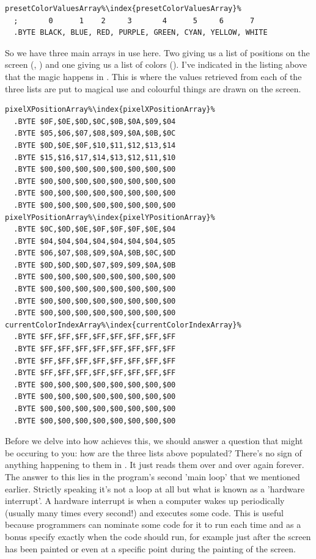 \begin{lstlisting}[escapechar=\%]
presetColorValuesArray%\index{presetColorValuesArray}%
  ;       0      1    2     3       4      5     6      7
  .BYTE BLACK, BLUE, RED, PURPLE, GREEN, CYAN, YELLOW, WHITE
\end{lstlisting}

So we have three main arrays in use here. Two giving us a list of positions on the screen (, )
and one giving us a list of colors (). I've indicated in the listing above that the magic happens in 
. This is where the values retrieved from each of the three lists are put to magical use and colourful things
are drawn on the screen.

\begin{lstlisting}[caption=The arrays have a larger capacity than is actually used\, each one above is 64 bytes long.,escapechar=\%]
pixelXPositionArray%\index{pixelXPositionArray}%   
  .BYTE $0F,$0E,$0D,$0C,$0B,$0A,$09,$04
  .BYTE $05,$06,$07,$08,$09,$0A,$0B,$0C
  .BYTE $0D,$0E,$0F,$10,$11,$12,$13,$14
  .BYTE $15,$16,$17,$14,$13,$12,$11,$10
  .BYTE $00,$00,$00,$00,$00,$00,$00,$00
  .BYTE $00,$00,$00,$00,$00,$00,$00,$00
  .BYTE $00,$00,$00,$00,$00,$00,$00,$00
  .BYTE $00,$00,$00,$00,$00,$00,$00,$00
pixelYPositionArray%\index{pixelYPositionArray}%   
  .BYTE $0C,$0D,$0E,$0F,$0F,$0F,$0E,$04
  .BYTE $04,$04,$04,$04,$04,$04,$04,$05
  .BYTE $06,$07,$08,$09,$0A,$0B,$0C,$0D
  .BYTE $0D,$0D,$0D,$07,$09,$09,$0A,$0B
  .BYTE $00,$00,$00,$00,$00,$00,$00,$00
  .BYTE $00,$00,$00,$00,$00,$00,$00,$00
  .BYTE $00,$00,$00,$00,$00,$00,$00,$00
  .BYTE $00,$00,$00,$00,$00,$00,$00,$00
currentColorIndexArray%\index{currentColorIndexArray}%   
  .BYTE $FF,$FF,$FF,$FF,$FF,$FF,$FF,$FF
  .BYTE $FF,$FF,$FF,$FF,$FF,$FF,$FF,$FF
  .BYTE $FF,$FF,$FF,$FF,$FF,$FF,$FF,$FF
  .BYTE $FF,$FF,$FF,$FF,$FF,$FF,$FF,$FF
  .BYTE $00,$00,$00,$00,$00,$00,$00,$00
  .BYTE $00,$00,$00,$00,$00,$00,$00,$00
  .BYTE $00,$00,$00,$00,$00,$00,$00,$00
  .BYTE $00,$00,$00,$00,$00,$00,$00,$00
\end{lstlisting}

Before we delve into how  achieves this, we should answer a question that might be occuring to you: how
are the three lists above populated? There's no sign of anything happening to them in . It just reads them over and
over again forever. The answer to this lies in the program's second 'main loop' that we mentioned earlier. 
Strictly speaking it's not a loop at all but what is known
as a 'hardware interrupt'. A hardware interrupt is when a computer wakes up periodically (usually many times every second!) and executes
some code. This is useful because programmers can nominate some code for it to run each time and as a bonus specify exactly when the code
should run, for example just after the screen has been painted or even at a specific point during the painting of the screen.  

